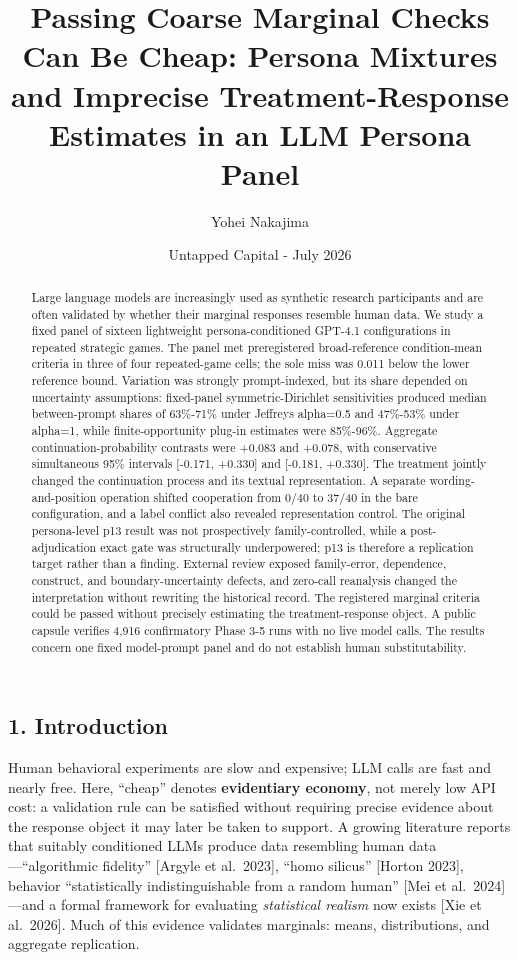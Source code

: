 \documentclass[
  11pt]{article}
\title{Passing Coarse Marginal Checks Can Be Cheap: Persona Mixtures and
Imprecise Treatment-Response Estimates in an LLM Persona Panel}
\author{Yohei Nakajima}
\date{Untapped Capital - July 2026}
\begin{document}
\maketitle
\begin{abstract}
Large language models are increasingly used as synthetic research
participants and are often validated by whether their marginal responses
resemble human data. We study a fixed panel of sixteen lightweight
persona-conditioned GPT-4.1 configurations in repeated strategic games.
The panel met preregistered broad-reference condition-mean criteria in
three of four repeated-game cells; the sole miss was 0.011 below the
lower reference bound. Variation was strongly prompt-indexed, but its
share depended on uncertainty assumptions: fixed-panel
symmetric-Dirichlet sensitivities produced median between-prompt shares
of 63\%-71\% under Jeffreys alpha=0.5 and 47\%-53\% under alpha=1, while
finite-opportunity plug-in estimates were 85\%-96\%. Aggregate
continuation-probability contrasts were +0.083 and +0.078, with
conservative simultaneous 95\% intervals {[}-0.171, +0.330{]} and
{[}-0.181, +0.330{]}. The treatment jointly changed the continuation
process and its textual representation. A separate wording-and-position
operation shifted cooperation from 0/40 to 37/40 in the bare
configuration, and a label conflict also revealed representation
control. The original persona-level p13 result was not prospectively
family-controlled, while a post-adjudication exact gate was structurally
underpowered; p13 is therefore a replication target rather than a
finding. External review exposed family-error, dependence, construct,
and boundary-uncertainty defects, and zero-call reanalysis changed the
interpretation without rewriting the historical record. The registered
marginal criteria could be passed without precisely estimating the
treatment-response object. A public capsule verifies 4,916 confirmatory
Phase 3-5 runs with no live model calls. The results concern one fixed
model-prompt panel and do not establish human substitutability.
\end{abstract}

\subsection{1. Introduction}\label{introduction}

Human behavioral experiments are slow and expensive; LLM calls are fast
and nearly free. Here, ``cheap'' denotes \textbf{evidentiary economy},
not merely low API cost: a validation rule can be satisfied without
requiring precise evidence about the response object it may later be
taken to support. A growing literature reports that suitably conditioned
LLMs produce data resembling human data---``algorithmic fidelity''
{[}Argyle et al.~2023{]}, ``homo silicus'' {[}Horton 2023{]}, behavior
``statistically indistinguishable from a random human'' {[}Mei et
al.~2024{]}---and a formal framework for evaluating \emph{statistical
realism} now exists {[}Xie et al.~2026{]}. Much of this evidence
validates marginals: means, distributions, and aggregate replication.
\end{document}
